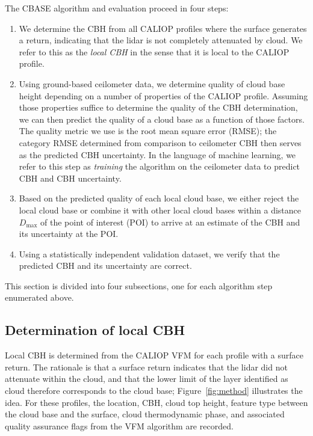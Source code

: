 \documentclass[essd,manuscript]{copernicus}\usepackage[]{graphicx}\usepackage[]{color}
\begin{document}
The CBASE algorithm and evaluation proceed in four steps:
\begin{enumerate}
\item We determine the CBH from all CALIOP profiles where the
  surface generates a return, indicating that the lidar is not completely
  attenuated by cloud.  We refer to this as the \textit{local
    CBH} in the sense that it is local to the CALIOP profile.
\item Using ground-based ceilometer data, we determine quality of cloud base
  height depending on a number of properties of the CALIOP profile.  Assuming
  those properties suffice to determine the quality of the CBH determination, we
  can then predict the quality of a cloud base as a function of those factors.
  The quality metric we use is the root mean square error (RMSE); the category
  RMSE determined from comparison to ceilometer CBH then serves as the predicted
  CBH uncertainty.  In the language of machine learning, we refer to this step
  as \textit{training} the algorithm on the ceilometer data to predict CBH and
  CBH uncertainty.
\item Based on the predicted quality of each local cloud base, we either reject
  the local cloud base or combine it with other local cloud bases within a
  distance $D_\text{max}$ of the point of interest (POI) to arrive at an 
  estimate of the CBH and its uncertainty at the POI.
\item Using a statistically independent validation dataset, we verify that the
  predicted CBH and its uncertainty are correct.
\end{enumerate}

This section is divided into four subsections, one for each algorithm step
enumerated above.

\subsection{Determination of local CBH}
\label{sec:algorithm:local}
Local CBH is determined from the CALIOP VFM for each profile with a surface
return.  The rationale is that a surface return indicates that the lidar did not
attenuate within the cloud, and that the lower limit of the layer identified as
cloud therefore corresponds to the cloud base; Figure~\ref{fig:method}
illustrates the idea.  For these profiles, the location, CBH, cloud top height,
feature type between the cloud base and the surface,
cloud thermodynamic phase, and associated quality assurance flags from the VFM
algorithm are recorded.
\end{document}
